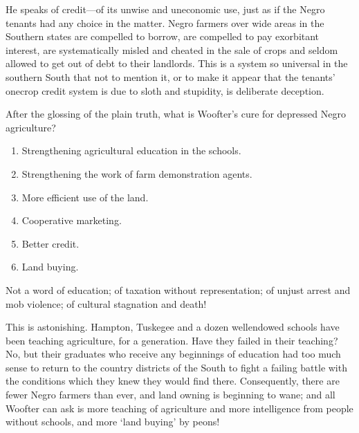 \documentclass[letterpaper,10pt,english]{jupyterBook}
\begin{document}
\sphinxAtStartPar
He speaks of credit—of its unwise and uneconomic use, just as if the Negro tenants had any choice in the matter. Negro farmers over wide areas in the Southern states are compelled to borrow, are compelled to pay exorbitant interest, are systematically misled and cheated in the sale of crops and seldom allowed to get out of debt to their landlords. This is a system so universal in the southern South that not to mention it, or to make it appear that the tenants’ one\sphinxhyphen{}crop credit system is due to sloth and stupidity, is deliberate deception.

\sphinxAtStartPar
After the glossing of the plain truth, what is Woofter’s cure for depressed Negro agriculture?
\begin{enumerate}
%
\item {} 
\sphinxAtStartPar
Strengthening agricultural education in the schools.

\item {} 
\sphinxAtStartPar
Strengthening the work of farm demonstration agents.

\item {} 
\sphinxAtStartPar
More efficient use of the land.

\item {} 
\sphinxAtStartPar
Co\sphinxhyphen{}operative marketing.

\item {} 
\sphinxAtStartPar
Better credit.

\item {} 
\sphinxAtStartPar
Land buying.

\end{enumerate}

\sphinxAtStartPar
Not a word of education; of taxation without representation; of unjust arrest and mob violence; of cultural stagnation and death!

\sphinxAtStartPar
This is astonishing. Hampton, Tuskegee and a dozen well\sphinxhyphen{}endowed schools have been teaching agriculture, for a generation. Have they failed in their teaching? No, but their graduates who receive any beginnings of education had too much sense to return to the country districts of the South to fight a failing battle with the conditions which they knew they would find there. Consequently, there are fewer Negro farmers than ever, and land owning is beginning to wane; and all Woofter can ask is more teaching of agriculture and more intelligence from people without schools, and more ‘land buying’ by peons!
\end{document}
